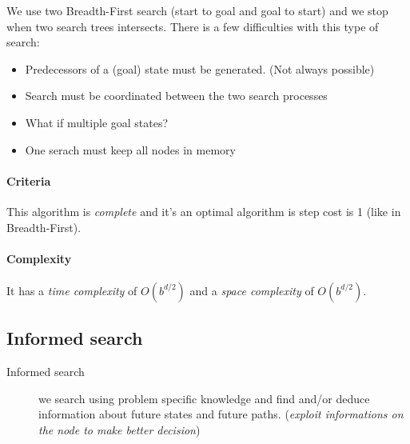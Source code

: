 We  use two Breadth-First search (start to goal and goal to start)  and   we  stop  when  two  search  trees
intersects. There is a few difficulties with this type of search:

\begin{itemize}
    \item Predecessors of a (goal) state must be generated. (Not always possible)
    \item Search must be coordinated between the two search processes
    \item What if multiple goal states?
    \item One serach must keep all nodes in memory
\end{itemize} 

\paragraph{Criteria}  This algorithm  is \textit{complete}  and it's  an
optimal algorithm is step cost is 1 (like in Breadth-First).

\paragraph{Complexity} It has a \textit{time complexity} of $O(b^{d/2})$
and a \textit{space complexity} of $O(b^{d/2})$.




\subsection{Informed search}

\begin{description}
    \item[Informed search] we search using problem specific knowledge and find and/or deduce information about future states and future paths. (\textit{exploit informations on the node
        to make better decision})
\end{description}


